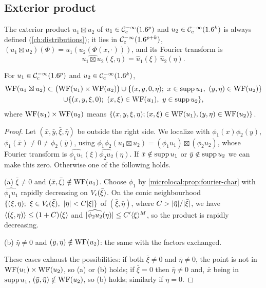 \subsection{Exterior product}
The exterior product $u_1\boxtimes u_2$ of $u_1\in\mathcal{C}^{-\infty}_{\mathrm{c}}(1.6^p)$ and
$u_2\in\mathcal{C}^{-\infty}_{\mathrm{c}}(1.6^k)$ is always defined (\cref{ch:distributions}); it lies in
$\mathcal{C}^{-\infty}_{\mathrm{c}}(1.6^{p+k})$, $(u_1\boxtimes u_2)(\Phi)=u_1(u_2(\Phi(x,\cdot)))$, and
its Fourier transform is
\begin{equation*}
  \widehat{u_1\boxtimes u_2}(\xi,\eta)=\hat u_1(\xi)\,\hat u_2(\eta).
\end{equation*}

\begin{proposition}\label{microlocal:prop:exterior}
  For $u_1\in\mathcal{C}^{-\infty}_{\mathrm{c}}(1.6^p)$ and $u_2\in\mathcal{C}^{-\infty}_{\mathrm{c}}(1.6^k)$,
  \begin{multline*}
    \operatorname{WF}(u_1\boxtimes u_2)\subset\bigl(\operatorname{WF}(u_1)\times\operatorname{WF}(u_2)\bigr)
    \cup\{(x,y,0,\eta);\ x\in\operatorname{supp} u_1,\ (y,\eta)\in\operatorname{WF}(u_2)\}\\
    \cup\{(x,y,\xi,0);\ (x,\xi)\in\operatorname{WF}(u_1),\ y\in\operatorname{supp} u_2\},
  \end{multline*}
  where $\operatorname{WF}(u_1)\times\operatorname{WF}(u_2)$ means
  $\{(x,y,\xi,\eta);(x,\xi)\in\operatorname{WF}(u_1),(y,\eta)\in\operatorname{WF}(u_2)\}$.
\end{proposition}
\begin{proof}
  Let $(\bar x,\bar y,\bar\xi,\bar\eta)$ be outside the right side. We localize
  with $\phi_1(x)\phi_2(y)$, $\phi_1(\bar x)\ne0\ne\phi_2(\bar y)$, using
  $\phi_1\phi_2(u_1\boxtimes u_2)=(\phi_1u_1)\boxtimes(\phi_2u_2)$, whose Fourier
  transform is $\widehat{\phi_1u_1}(\xi)\widehat{\phi_2u_2}(\eta)$. If
  $\bar x\notin\operatorname{supp} u_1$ or $\bar y\notin\operatorname{supp} u_2$ we can make this zero.
  Otherwise one of the following holds.

  (a) $\bar\xi\ne0$ and $(\bar x,\bar\xi)\notin\operatorname{WF}(u_1)$. Choose $\phi_1$ by
  \cref{microlocal:prop:fourier-char} with $\widehat{\phi_1u_1}$ rapidly
  decreasing on $V_\epsilon(\bar\xi)$. On the conic neighbourhood
  $\{(\xi,\eta);\ \xi\in V_\eps(\bar\xi),\ \abs\eta<C\abs\xi\}$ of
  $(\bar\xi,\bar\eta)$, where $C>\lvert \bar\eta\rvert/\lvert \bar\xi\rvert$, we have
  $\langle (\xi,\eta)\rangle\le(1+C)\langle \xi\rangle$ and
  $\lvert \widehat{\phi_2u_2}(\eta)\rvert\le C'\langle \xi\rangle^M$, so the product is rapidly
  decreasing.

  (b) $\bar\eta\ne0$ and $(\bar y,\bar\eta)\notin\operatorname{WF}(u_2)$: the same with the
  factors exchanged.

  These cases exhaust the possibilities: if both $\bar\xi\ne0$ and
  $\bar\eta\ne0$, the point is not in $\operatorname{WF}(u_1)\times\operatorname{WF}(u_2)$, so (a) or (b)
  holds; if $\bar\xi=0$ then $\bar\eta\ne0$ and, $\bar x$ being in $\operatorname{supp}
  u_1$, $(\bar y,\bar\eta)\notin\operatorname{WF}(u_2)$, so (b) holds; similarly if
  $\bar\eta=0$.
\end{proof}

